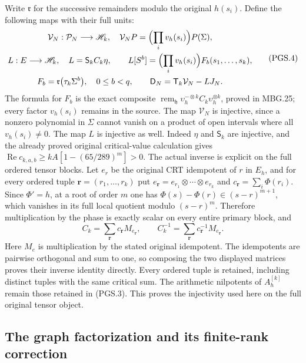 Write \(\mathfrak r\) for the successive remainders modulo the
original \(h(s_i)\). Define the following maps with their full units:
\[
\begin{gathered}
 \mathcal V_N:\mathcal P_N\longrightarrow\mathscr H_k,\quad
 \mathcal V_NP=\Bigl(\prod_i v_h(s_i)\Bigr)P(\Sigma),\\
 L:E\longrightarrow\mathscr H_k,\quad L=\mathsf S_k C_k\eta,
 \qquad L[S^b]=\Bigl(\prod_i v_h(s_i)\Bigr)F_b(s_1,\ldots,s_k),\\
 F_b=\mathfrak r\bigl(\tau_k\Sigma^b\bigr),\quad0\le b<q,
 \qquad\mathsf D_N=\mathsf T_k\mathcal V_N-LJ_N.
\end{gathered}
\tag{PGS.4}\label{GraphV2:eq:pgs-VL}
\]
The formula for \(F_b\) is the exact composite
\(\operatorname{rem}_{\mathfrak h}\upsilon_h^{-\otimes k}
C_k\upsilon_h^{\otimes k}\), proved in MBG.25; every factor
\(v_h(s_i)\) remains in the source. The map \(\mathcal V_N\) is
injective, since a nonzero polynomial in \(\Sigma\) cannot vanish
on a product of open intervals where all \(v_h(s_i)\ne0\).
The map \(L\) is injective as well. Indeed \(\eta\) and
\(\mathsf S_k\) are injective, and the already proved original
critical-value calculation gives
\(\operatorname{Re}c_{k,a,b}\ge
kA[1-(65/289)^m]>0\).
The actual inverse is explicit on the full ordered tensor blocks.
Let \(e_r\) be the original CRT idempotent of \(r\) in \(E_h\),
and for every ordered tuple \(\boldsymbol r=(r_1,\ldots,r_k)\)
put \(e_{\boldsymbol r}=e_{r_1}\otimes\cdots\otimes e_{r_k}\)
and \(c_{\boldsymbol r}=\sum_i\Phi(r_i)\). Since \(\Phi'=h\),
at a root of order \(m\) one has
\(\Phi(s)-\Phi(r)\in(s-r)^{m+1}\), which vanishes in its full
local quotient modulo \((s-r)^m\). Therefore multiplication by
the phase is exactly scalar on every entire primary block, and
\[
 C_k=\sum_{\boldsymbol r}c_{\boldsymbol r}M_{e_{\boldsymbol r}},
 \qquad
 C_k^{-1}=\sum_{\boldsymbol r}c_{\boldsymbol r}^{-1}
                                  M_{e_{\boldsymbol r}}.
\]
Here \(M_e\) is multiplication by the stated original idempotent.
The idempotents are pairwise orthogonal and sum to one, so composing
the two displayed matrices proves their inverse identity directly.
Every ordered tuple is retained, including distinct tuples with the
same critical sum. The arithmetic nilpotents of \(A_h^{[k]}\)
remain those retained in (PGS.3). This proves
the injectivity used here on the full original tensor object.

\subsection{The graph factorization and its finite-rank correction}

